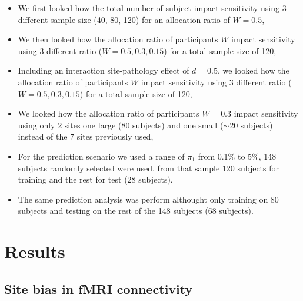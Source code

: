 \documentclass[authoryear]{elsarticle}
\begin{document}
\begin{itemize}
 \item We first looked how the total number of subject impact sensitivity using 3 different sample size (40, 80, 120) for an allocation ratio of $W=0.5$,
 \item We then looked how the allocation ratio of participants $W$ impact sensitivity using 3 different ratio ($W=0.5,0.3,0.15$) for a total sample size of 120,
 \item Including an interaction site-pathology effect of $d=0.5$, we looked how the allocation ratio of participants $W$ impact sensitivity using 3 different ratio ($W=0.5,0.3,0.15$) for a total sample size of 120,
 \item We looked how the allocation ratio of participants $W=0.3$ impact sensitivity using only 2 sites one large (80 subjects) and one small ($\sim20$ subjects) instead of the 7 sites previously used,
 \item For the prediction scenario we used a range of $\pi_1$ from 0.1\% to 5\%, 148 subjects randomly selected were used, from that sample 120 subjects for training and the rest for test (28 subjects).
 \item The same prediction analysis was perform althought only training on 80 subjects and testing on the rest of the 148 subjects (68 subjects).
\end{itemize}


\section{Results}

\subsection{Site bias in fMRI connectivity}
\end{document}
